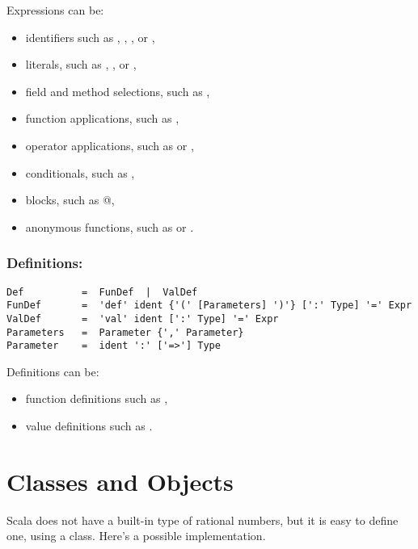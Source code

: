 Expressions can be:
\begin{itemize}
\item
identifiers such as , , \code{*}, or \code{+-},
\item
literals, such as , , or ,
\item
field and method selections, such as ,
\item
function applications, such as , 
\item
operator applications, such as  or ,
\item
conditionals, such as ,
\item
blocks, such as @,
\item
anonymous functions, such as  or .
\end{itemize}

\subsection*{Definitions:}

\begin{lstlisting}
Def          =  FunDef  |  ValDef
FunDef       =  'def' ident {'(' [Parameters] ')'} [':' Type] '=' Expr
ValDef       =  'val' ident [':' Type] '=' Expr
Parameters   =  Parameter {',' Parameter}
Parameter    =  ident ':' ['=>'] Type
\end{lstlisting}
Definitions can be:
\begin{itemize}
\item
function definitions such as ,
\item
value definitions such as .
\end{itemize}

\chapter{Classes and Objects}
\label{chap:classes}

Scala does not have a built-in type of rational numbers, but it is
easy to define one, using a class. Here's a possible implementation.

